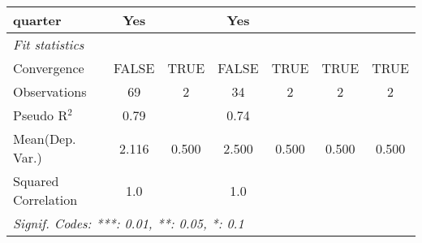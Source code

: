 \begin{tabular}{lcccccc}
   quarter                    & Yes          &      & Yes           &      &      & \\  
   \midrule
   \emph{Fit statistics}\\
   Convergence                &FALSE         & TRUE & FALSE         & TRUE & TRUE & TRUE\\  
   Observations               & 69           & 2    & 34            & 2    & 2    & 2\\  
   Pseudo R$^2$               & 0.79         &      & 0.74          &      &      & \\  
Mean(Dep. Var.) & 2.116 & 0.500 & 2.500 & 0.500 & 0.500 & 0.500 \\
   Squared Correlation        & 1.0          &      & 1.0           &      &      & \\  
   \midrule \midrule
   \multicolumn{7}{l}{\emph{Signif. Codes: ***: 0.01, **: 0.05, *: 0.1}}\\
\end{tabular}
\par\endgroup

